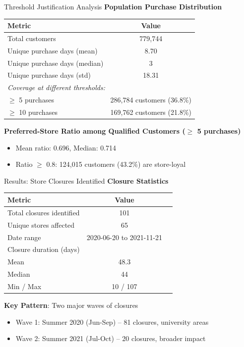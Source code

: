 \documentclass[aspectratio=169]{beamer}  %
\begin{document}
\begin{frame}{Threshold Justification Analysis}
\textbf{Population Purchase Distribution}
\begin{table}[h]
\centering
\small
\begin{tabular}{lc}
\toprule
\textbf{Metric} & \textbf{Value} \\
\midrule
Total customers & 779,744 \\
Unique purchase days (mean) & 8.70 \\
Unique purchase days (median) & 3 \\
Unique purchase days (std) & 18.31 \\
\midrule
\multicolumn{2}{l}{\textit{Coverage at different thresholds:}} \\
$\geq$ 5 purchases & 286,784 customers (36.8\%) \\
$\geq$ 10 purchases & 169,762 customers (21.8\%) \\
\bottomrule
\end{tabular}
\end{table}

\textbf{Preferred-Store Ratio among Qualified Customers ($\geq$ 5 purchases)}
\begin{itemize}
    \item Mean ratio: 0.696, Median: 0.714
    \item Ratio $\geq$ 0.8: 124,015 customers (43.2\%) are store-loyal
\end{itemize}
\end{frame}

\begin{frame}{Results: Store Closures Identified}
\textbf{Closure Statistics}
\begin{table}[h]
\centering
\small
\begin{tabular}{lcc}
\toprule
\textbf{Metric} & \textbf{Value} \\
\midrule
Total closures identified & 101 \\
Unique stores affected & 65 \\
Date range & 2020-06-20 to 2021-11-21 \\
\midrule
Closure duration (days) & \\
\quad Mean & 48.3 \\
\quad Median & 44 \\
\quad Min / Max & 10 / 107 \\
\bottomrule
\end{tabular}
\end{table}

\textbf{Key Pattern}: Two major waves of closures
\begin{itemize}
    \item Wave 1: Summer 2020 (Jun-Sep) -- 81 closures, university areas
    \item Wave 2: Summer 2021 (Jul-Oct) -- 20 closures, broader impact
\end{itemize}
\end{frame}
\end{document}

